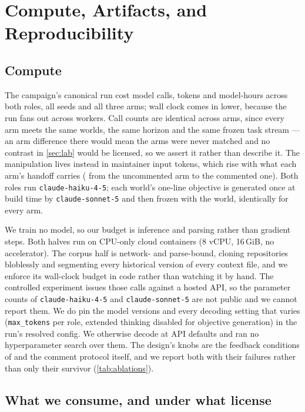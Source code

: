 
\section{Compute, Artifacts, and Reproducibility}
\label{sec:appendix:artifacts}

\subsection{Compute}
\label{sec:appendix:compute}

The campaign's canonical run cost \CostCalls{} model calls, \CostTokens{} tokens and
\CostModelHours{} model-hours across both roles, all \LabSeeds{} seeds and all three arms; wall
clock comes in lower, because the run fans out across workers. Call counts are identical across
arms, since every arm meets the same worlds, the same horizon and the same frozen task stream --- an
arm difference there would mean the arms were never matched and no contrast in \autoref{sec:lab}
would be licensed, so we assert it rather than describe it. The manipulation lives instead in
maintainer input tokens, which rise with what each arm's handoff carries
(\CostMaintainerInRange{} from the uncommented arm to the commented one). Both roles run
\texttt{claude-haiku-4-5}; each world's one-line objective is generated once at build time by
\texttt{claude-sonnet-5} and then frozen with the world, identically for every arm.

We train no model, so our budget is inference and parsing rather than gradient steps. Both halves
run on CPU-only cloud containers (8 vCPU, 16\,GiB, no accelerator). The corpus half is network- and
parse-bound, cloning \FieldRepos{} repositories bloblessly and segmenting every historical version
of every context file, and we enforce its wall-clock budget in code rather than watching it by
hand. The controlled experiment issues those calls against a hosted API, so the
parameter counts of \texttt{claude-haiku-4-5} and \texttt{claude-sonnet-5} are not public and we
cannot report them. We do pin the model versions and every decoding setting that varies
(\texttt{max\_tokens} per role, extended thinking disabled for objective generation) in the run's
resolved config. We otherwise decode at API defaults and ran no hyperparameter search over them.
The design's knobs are the feedback conditions of  and the comment
protocol itself, and we report both with their failures rather than only their survivor
(\autoref{tab:ablations}).

\subsection{What we consume, and under what license}
\label{sec:appendix:licenses}

